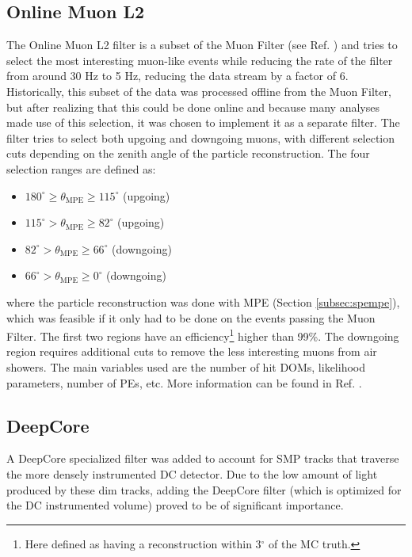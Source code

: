 \subsection{Online Muon L2}
The Online Muon L2 filter is a subset of the Muon Filter (see Ref. \cite{muon2012filter}) and tries to select the most interesting muon-like events while reducing the rate of the filter from around 30 Hz to 5 Hz, reducing the data stream by a factor of 6. Historically, this subset of the data was processed offline from the Muon Filter, but after realizing that this could be done online and because many analyses made use of this selection, it was chosen to implement it as a separate filter. The filter tries to select both upgoing and downgoing muons, with different selection cuts depending on the zenith angle of the particle reconstruction. The four selection ranges are defined as:
\vspace{2mm}
\begin{itemize}
\item $180^\circ \geq \theta_\textrm{MPE} \geq 115^\circ$ (upgoing)
\item $115^\circ > \theta_\textrm{MPE} \geq 82^\circ$ (upgoing)
\item $82^\circ > \theta_\textrm{MPE} \geq 66^\circ$ (downgoing)
\item $66^\circ > \theta_\textrm{MPE} \geq 0^\circ$ (downgoing)
\end{itemize}
\vspace{2mm}
where the particle reconstruction was done with MPE (Section \ref{subsec:spempe}), which was feasible if it only had to be done on the events passing the Muon Filter. The first two regions have an efficiency\footnote{Here defined as having a reconstruction within 3$^\circ$ of the MC truth.} higher than 99\%. The downgoing region requires additional cuts to remove the less interesting muons from air showers. The main variables used are the number of hit DOMs, likelihood parameters, number of PEs, etc. More information can be found in Ref. \cite{OnlineMuonL22012}.

\subsection{DeepCore}
A DeepCore specialized filter was added to account for SMP tracks that traverse the more densely instrumented DC detector. Due to the low amount of light produced by these dim tracks, adding the DeepCore filter (which is optimized for the DC instrumented volume) proved to be of significant importance.

